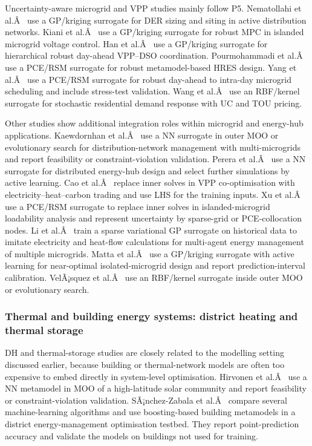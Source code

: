 \documentclass[final,5p,times,twocolumn]{elsarticle}
\begin{document}
Uncertainty-aware microgrid and VPP studies mainly follow P5.
Nematollahi et al.Â~\cite{Nematollahi2021} use a GP/kriging surrogate for DER
sizing and siting in active distribution networks. Kiani et
al.Â~\cite{Kiani20253021} use a GP/kriging surrogate for robust MPC in
islanded microgrid voltage control. Han et al.Â~\cite{Han2024} use a
GP/kriging surrogate for hierarchical robust day-ahead VPP--DSO
coordination. Pourmohammadi et al.Â~\cite{Pourmohammadi2023} use a PCE/RSM
surrogate for robust metamodel-based HRES design. Yang et
al.Â~\cite{Yang2024__2} use a PCE/RSM surrogate for robust day-ahead to
intra-day microgrid scheduling and include stress-test validation. Wang
et al.Â~\cite{Wang20211767} use an RBF/kernel surrogate for stochastic
residential demand response with UC and TOU pricing.

Other studies show additional integration roles within microgrid and
energy-hub applications. Kaewdornhan et al.Â~\cite{Kaewdornhan2022130373} use
a NN surrogate in outer MOO or evolutionary search for
distribution-network management with multi-microgrids and report
feasibility or constraint-violation validation. Perera et
al.Â~\cite{Perera2017187} use a NN surrogate for distributed energy-hub
design and select further simulations by active learning. Cao et
al.Â~\cite{Cao2023__2} replace inner solves in VPP co-optimisation with
electricity--heat--carbon trading and use LHS for the training inputs.
Xu et al.Â~\cite{Xu20184696} use a PCE/RSM surrogate to replace inner solves
in islanded-microgrid loadability analysis and represent uncertainty by
sparse-grid or PCE-collocation nodes. Li et al.Â~\cite{Li2023__3} train a
sparse variational GP surrogate on historical data to imitate
electricity and heat-flow calculations for multi-agent energy
management of multiple microgrids. Matta et
al.Â~\cite{Matta2026} use a GP/kriging surrogate with active learning for
near-optimal isolated-microgrid design and report prediction-interval
calibration. VelÃ¡squez et al.Â~\cite{velasquez_intelligence_2023} use an
RBF/kernel surrogate inside outer MOO or evolutionary search.

\subsubsection{Thermal and building energy systems: district heating and thermal storage}
\label{sec:apps:dh}

DH and thermal-storage studies are closely related to the modelling
setting discussed earlier, because building or thermal-network models
are often too expensive to embed directly in system-level optimisation.
Hirvonen et al.Â~\cite{Hirvonen2017323} use a NN metamodel in MOO of a
high-latitude solar community and report feasibility or
constraint-violation validation. SÃ¡nchez-Zabala et
al.Â~\cite{Sánchez-Zabala2024} compare several machine-learning algorithms
and use boosting-based building metamodels in a district
energy-management optimisation testbed. They report point-prediction
accuracy and validate the models on buildings not used for training.
\end{document}
